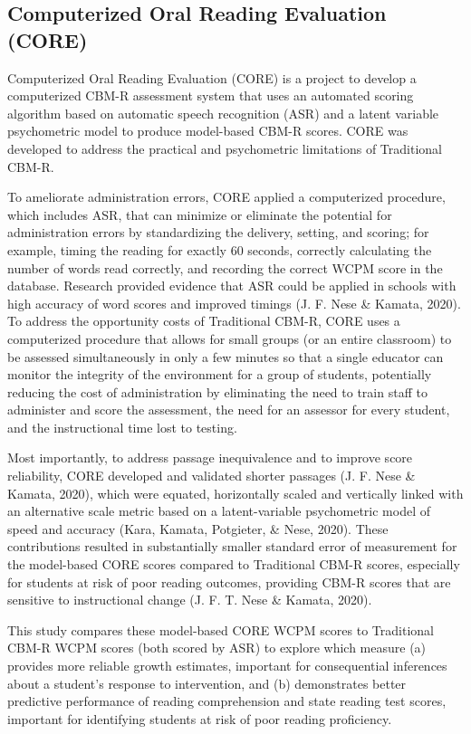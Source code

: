 \documentclass[
  english,
  man, fleqn, noextraspace]{apa6}
\begin{document}
\hypertarget{computerized-oral-reading-evaluation-core}{%
\subsection{Computerized Oral Reading Evaluation (CORE)}\label{computerized-oral-reading-evaluation-core}}

Computerized Oral Reading Evaluation (CORE) is a project to develop a computerized CBM-R assessment system that uses an automated scoring algorithm based on automatic speech recognition (ASR) and a latent variable psychometric model to produce model-based CBM-R scores. CORE was developed to address the practical and psychometric limitations of Traditional CBM-R.

To ameliorate administration errors, CORE applied a computerized procedure, which includes ASR, that can minimize or eliminate the potential for administration errors by standardizing the delivery, setting, and scoring; for example, timing the reading for exactly 60 seconds, correctly calculating the number of words read correctly, and recording the correct WCPM score in the database. Research provided evidence that ASR could be applied in schools with high accuracy of word scores and improved timings (J. F. Nese \& Kamata, 2020). To address the opportunity costs of Traditional CBM-R, CORE uses a computerized procedure that allows for small groups (or an entire classroom) to be assessed simultaneously in only a few minutes so that a single educator can monitor the integrity of the environment for a group of students, potentially reducing the cost of administration by eliminating the need to train staff to administer and score the assessment, the need for an assessor for every student, and the instructional time lost to testing.

Most importantly, to address passage inequivalence and to improve score reliability, CORE developed and validated shorter passages (J. F. Nese \& Kamata, 2020), which were equated, horizontally scaled and vertically linked with an alternative scale metric based on a latent-variable psychometric model of speed and accuracy (Kara, Kamata, Potgieter, \& Nese, 2020). These contributions resulted in substantially smaller standard error of measurement for the model-based CORE scores compared to Traditional CBM-R scores, especially for students at risk of poor reading outcomes, providing CBM-R scores that are sensitive to instructional change (J. F. T. Nese \& Kamata, 2020).

This study compares these model-based CORE WCPM scores to Traditional CBM-R WCPM scores (both scored by ASR) to explore which measure (a) provides more reliable growth estimates, important for consequential inferences about a student's response to intervention, and (b) demonstrates better predictive performance of reading comprehension and state reading test scores, important for identifying students at risk of poor reading proficiency.
\end{document}
